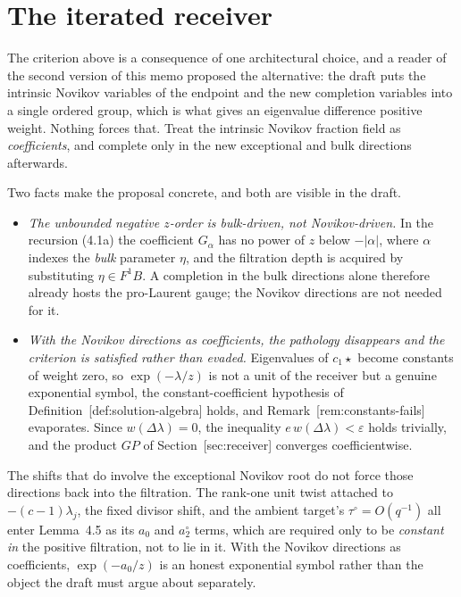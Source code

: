 \documentclass[11pt]{article}
\theoremstyle{definition}
\theoremstyle{remark}
\begin{document}
\section{The iterated receiver}


The criterion above is a consequence of one architectural choice, and a reader
of the second version of this memo proposed the alternative: the draft puts the
intrinsic Novikov variables of the endpoint and the new completion variables
into a single ordered group, which is what gives an eigenvalue difference
positive weight. Nothing forces that. Treat the intrinsic Novikov fraction field
as \emph{coefficients}, and complete only in the new exceptional and bulk
directions afterwards.

Two facts make the proposal concrete, and both are visible in the draft.

\begin{itemize}
\item \emph{The unbounded negative $z$-order is bulk-driven, not
  Novikov-driven.} In the recursion (4.1a) the coefficient $G_\alpha$ has no
  power of $z$ below $-|\alpha|$, where $\alpha$ indexes the \emph{bulk}
  parameter $\eta$, and the filtration depth is acquired by substituting
  $\eta\in F^1B$. A completion in the bulk directions alone therefore already
  hosts the pro-Laurent gauge; the Novikov directions are not needed for it.
\item \emph{With the Novikov directions as coefficients, the pathology
  disappears and the criterion is satisfied rather than evaded.} Eigenvalues of
  $c_1\star$ become constants of weight zero, so $\exp(-\lambda/z)$ is not a
  unit of the receiver but a genuine exponential symbol, the constant-coefficient
  hypothesis of Definition~\textup{[def:solution-algebra]} holds, and
  Remark~\textup{[rem:constants-fails]} evaporates. Since $w(\Delta\lambda)=0$, the
  inequality $e\,w(\Delta\lambda)<\varepsilon$ holds trivially, and the product
  $GP$ of Section~\textup{[sec:receiver]} converges coefficientwise.
\end{itemize}

The shifts that do involve the exceptional Novikov root do not force those
directions back into the filtration. The rank-one unit twist attached to
$-(c-1)\lambda_j$, the fixed divisor shift, and the ambient target's
$\tau^\circ=O(q^{-1})$ all enter Lemma~4.5 as its $a_0$ and $a_2^\circ$ terms,
which are required only to be \emph{constant in} the positive filtration, not to
lie in it. With the Novikov directions as coefficients, $\exp(-a_0/z)$ is an
honest exponential symbol rather than the object the draft must argue about
separately.
\end{document}
